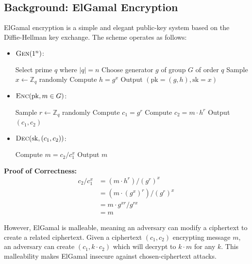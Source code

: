 \subsection{Background: ElGamal Encryption}

ElGamal encryption is a simple and elegant public-key system based on the Diffie-Hellman key exchange. The scheme operates as follows:

\begin{itemize}
    \item $\textsc{Gen}(1^n)$:
        \begin{algorithmic}
            \State Select prime $q$ where $|q|=n$
            \State Choose generator $g$ of group $G$ of order $q$
            \State Sample $x \gets \mathbb{Z}_q$ randomly
            \State Compute $h = g^x$
            \State Output $(\mathrm{pk}=(g,h), \mathrm{sk}=x)$
        \end{algorithmic}
    
    \item $\textsc{Enc}(\mathrm{pk}, m \in G)$:
        \begin{algorithmic}
            \State Sample $r \gets \mathbb{Z}_q$ randomly
            \State Compute $c_1 = g^r$
            \State Compute $c_2 = m \cdot h^r$
            \State Output $(c_1, c_2)$
        \end{algorithmic}

    \item $\textsc{Dec}(\mathrm{sk}, (c_1, c_2))$:
        \begin{algorithmic}
            \State Compute $m = c_2/c_1^x$
            \State Output $m$
        \end{algorithmic}
\end{itemize}

\textbf{Proof of Correctness:}
\begin{align*}
    c_2/c_1^x &= (m \cdot h^r)/(g^r)^x \\
    &= (m \cdot (g^x)^r)/(g^r)^x \\
    &= m \cdot g^{xr}/g^{rx} \\
    &= m
\end{align*}

However, ElGamal is malleable, meaning an adversary can modify a ciphertext to create a related ciphertext. Given a ciphertext $(c_1, c_2)$ encrypting message $m$, an adversary can create $(c_1, k \cdot c_2)$ which will decrypt to $k \cdot m$ for any $k$. This malleability makes ElGamal insecure against chosen-ciphertext attacks.

